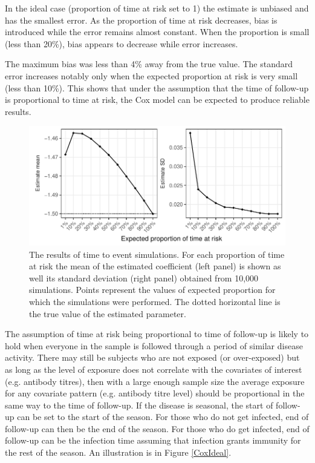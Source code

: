 \documentclass[12pt]{article}
\begin{document}
In the ideal case (proportion of time at risk set to 1) the estimate is unbiased and has the smallest error. As the proportion of time at risk decreases, bias is introduced while the error remains almost constant. When the proportion is small (less than 20\%), bias appears to decrease while error increases.

The maximum bias was less than 4\% away from the true value. The standard error increases notably only when the expected proportion at risk is very small (less than 10\%). This shows that under the assumption that the time of follow-up is proportional to time at risk, the Cox model can be expected to produce reliable results.

\begin{figure}[htp]
	\centering
	\includegraphics[width=1\textwidth]{../cox-tarprop-plot/risk.pdf}
	\caption{
	The results of time to event simulations. For each proportion of time at risk the mean of the estimated coefficient (left panel) is shown as well its standard deviation (right panel) obtained from 10,000 simulations. Points represent the values of expected proportion for which the simulations were performed. The dotted horizontal line is the true value of the estimated parameter.
	}
	\label{CoxSimResults}
\end{figure}

The assumption of time at risk being proportional to time of follow-up is likely to hold when everyone in the sample is followed through a period of similar disease activity. There may still be subjects who are not exposed (or over-exposed) but as long as the level of exposure does not correlate with the covariates of interest (e.g. antibody titres), then with a large enough sample size the average exposure for any covariate pattern (e.g. antibody titre level) should be proportional in the same way to the time of follow-up. If the disease is seasonal, the start of follow-up can be set to the start of the season. For those who do not get infected, end of follow-up can then be the end of the season. For those who do get infected, end of follow-up can be the infection time assuming that infection grants immunity for the rest of the season. An illustration is in Figure \ref{CoxIdeal}.
\end{document}
